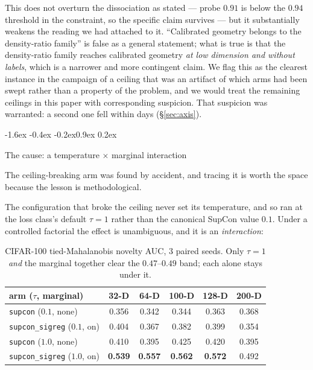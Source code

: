 \documentclass{article}
\makeatletter
\renewcommand\subsection{\@startsection{subsection}{2}{\z@}%
  {-1.6ex \@plus -0.4ex \@minus -0.2ex}{0.9ex \@plus 0.2ex}%
  {\normalsize\bf\raggedright}}
\newcommand{\best}[1]{\textbf{#1}}
\makeatother
\begin{document}
This does not overturn the dissociation as stated --- probe $0.91$ is below the
$0.94$ threshold in the constraint, so the specific claim survives --- but it
substantially weakens the reading we had attached to it. ``Calibrated geometry
belongs to the density-ratio family'' is false as a general statement; what is
true is that the density-ratio family reaches calibrated geometry \emph{at low
dimension and without labels}, which is a narrower and more contingent claim.
We flag this as the clearest instance in the campaign of a ceiling that was an
artifact of which arms had been swept rather than a property of the problem, and
we would treat the remaining ceilings in this paper with corresponding
suspicion. That suspicion was warranted: a second one fell within days
(\S\ref{sec:axis}).

\subsection{The cause: a temperature $\times$ marginal interaction}
\label{sec:tau}

The ceiling-breaking arm was found by accident, and tracing it is worth the
space because the lesson is methodological.

The configuration that broke the ceiling never set its temperature, and so ran
at the loss class's default $\tau=1$ rather than the canonical SupCon value
$0.1$. Under a controlled factorial the effect is unambiguous, and it is an
\emph{interaction}:

\begin{table}[h]\centering\small
\begin{tabular}{lccccc}
\toprule
arm ($\tau$, marginal) & 32-D & 64-D & 100-D & 128-D & 200-D \\
\midrule
\texttt{supcon} ($0.1$, none)         & 0.356 & 0.342 & 0.344 & 0.363 & 0.368 \\
\texttt{supcon\_sigreg} ($0.1$, on)   & 0.404 & 0.367 & 0.382 & 0.399 & 0.354 \\
\texttt{supcon} ($1.0$, none)         & 0.410 & 0.395 & 0.425 & 0.420 & 0.395 \\
\texttt{supcon\_sigreg} ($1.0$, on)   & \best{0.539} & \best{0.557} & \best{0.562} & \best{0.572} & 0.492 \\
\bottomrule
\end{tabular}
\caption{CIFAR-100 tied-Mahalanobis novelty AUC, 3 paired seeds. Only
$\tau=1$ \emph{and} the marginal together clear the $0.47$--$0.49$ band; each
alone stays under it.}
\label{tab:tau}
\end{table}
\end{document}
